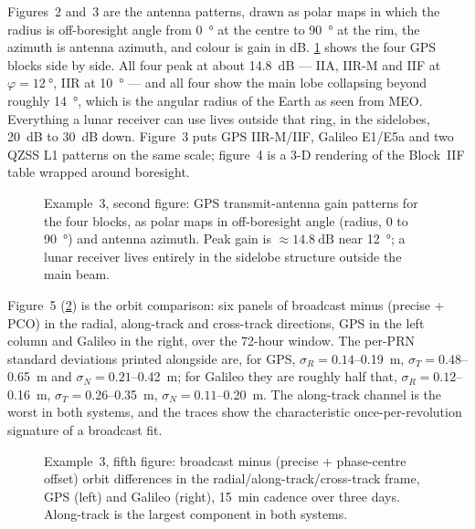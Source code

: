 Figures~2 and~3 are the antenna patterns, drawn as polar maps in which the
radius is off-boresight angle from \SI{0}{\degree} at the centre to
\SI{90}{\degree} at the rim, the azimuth is antenna azimuth, and colour is gain
in \si{\dB}. \cref{fig:tut-ex3-gain} shows the four GPS blocks side by side. All
four peak at about \SI{14.8}{\dB} --- IIA, IIR-M and IIF at
$\varphi=\SI{12}{\degree}$, IIR at \SI{10}{\degree} --- and all four show the
main lobe collapsing beyond roughly \SI{14}{\degree}, which is the angular
radius of the Earth as seen from MEO. Everything a lunar receiver can use lives
outside that ring, in the sidelobes, \SI{20}{\dB} to \SI{30}{\dB} down.
Figure~3 puts GPS IIR-M/IIF, Galileo E1/E5a and two QZSS L1 patterns on the same
scale; figure~4 is a 3-D rendering of the Block~IIF table wrapped around
boresight.

\begin{figure}[htbp]
  \centering
  \caption{Example~3, second figure: GPS transmit-antenna gain patterns for the
           four blocks, as polar maps in off-boresight angle (radius, $0$ to
           \SI{90}{\degree}) and antenna azimuth. Peak gain is
           $\approx\SI{14.8}{\dB}$ near \SI{12}{\degree}; a lunar receiver lives
           entirely in the sidelobe structure outside the main beam.}
  \label{fig:tut-ex3-gain}
\end{figure}

Figure~5 (\cref{fig:tut-ex3-rtn}) is the orbit comparison: six panels of
broadcast minus (precise + PCO) in the radial, along-track and cross-track
directions, GPS in the left column and Galileo in the right, over the 72-hour
window. The per-PRN standard deviations printed alongside are, for GPS,
$\sigma_R = 0.14$--\SI{0.19}{\meter}, $\sigma_T = 0.48$--\SI{0.65}{\meter} and
$\sigma_N = 0.21$--\SI{0.42}{\meter}; for Galileo they are roughly half that,
$\sigma_R = 0.12$--\SI{0.16}{\meter}, $\sigma_T = 0.26$--\SI{0.35}{\meter},
$\sigma_N = 0.11$--\SI{0.20}{\meter}. The along-track channel is the worst in
both systems, and the traces show the characteristic once-per-revolution
signature of a broadcast fit.

\begin{figure}[htbp]
  \centering
  \caption{Example~3, fifth figure: broadcast minus (precise + phase-centre
           offset) orbit differences in the radial/along-track/cross-track
           frame, GPS (left) and Galileo (right), \SI{15}{\minute} cadence over
           three days. Along-track is the largest component in both systems.}
  \label{fig:tut-ex3-rtn}
\end{figure}

